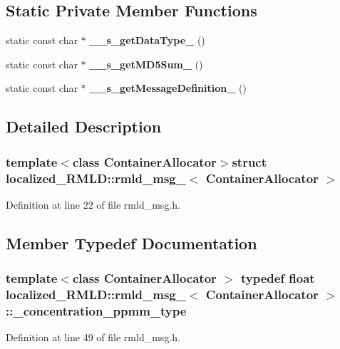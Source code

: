 \subsection*{Static Private Member Functions}
\begin{DoxyCompactItemize}
\item 
static const char $\ast$ {\bf \_\-\_\-s\_\-getDataType\_\-} ()
\item 
static const char $\ast$ {\bf \_\-\_\-s\_\-getMD5Sum\_\-} ()
\item 
static const char $\ast$ {\bf \_\-\_\-s\_\-getMessageDefinition\_\-} ()
\end{DoxyCompactItemize}


\subsection{Detailed Description}
\subsubsection*{template$<$class ContainerAllocator$>$struct localized\_\-RMLD::rmld\_\-msg\_\-$<$ ContainerAllocator $>$}



Definition at line 22 of file rmld\_\-msg.h.



\subsection{Member Typedef Documentation}
\subsubsection[{\_\-concentration\_\-ppmm\_\-type}]{\setlength{\rightskip}{0pt plus 5cm}template$<$class ContainerAllocator $>$ typedef float {\bf localized\_\-RMLD::rmld\_\-msg\_\-}$<$ ContainerAllocator $>$::{\bf \_\-concentration\_\-ppmm\_\-type}}\label{structlocalized__RMLD_1_1rmld__msg___a630c950bcc2f2266ac74349d53e461ec}


Definition at line 49 of file rmld\_\-msg.h.

